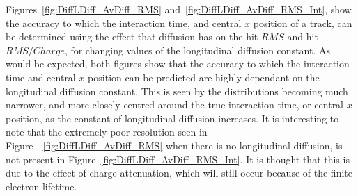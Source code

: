 Figures~\ref{fig:DiffLDiff_AvDiff_RMS} and~\ref{fig:DiffLDiff_AvDiff_RMS_Int}, show the accuracy to which the interaction time, and central $x$ position of a track, can be determined using the effect that diffusion has on the hit $RMS$ and hit $RMS/Charge$, for changing values of the longitudinal diffusion constant. As would be expected, both figures show that the accuracy to which the interaction time and central $x$ position can be predicted are highly dependant on the longitudinal diffusion constant. This is seen by the distributions becoming much narrower, and more closely centred around the true interaction time, or central $x$ position, as the constant of longitudinal diffusion increases. It is interesting to note that the extremely poor resolution seen in Figure~~\ref{fig:DiffLDiff_AvDiff_RMS} when there is no longitudinal diffusion, is not present in Figure~\ref{fig:DiffLDiff_AvDiff_RMS_Int}. It is thought that this is due to the effect of charge attenuation, which will still occur because of the finite electron lifetime. 

